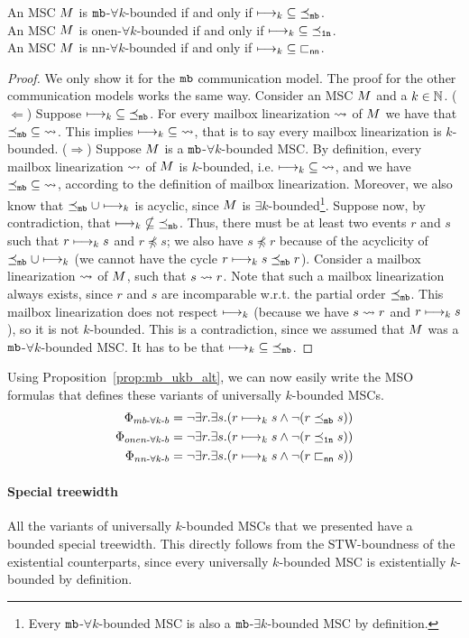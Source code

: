 \begin{proposition}\label{prop:mb_ukb_alt}
	An MSC $M$ is $\mathtt{mb}$-$\forall k$-bounded if and only if $\longmapsto_k \;\subseteq\; \preceq_{\mathtt{mb}}$.\\
	An MSC $M$ is onen-$\forall k$-bounded if and only if $\longmapsto_k \;\subseteq\; \preceq_{\mathtt{1n}}$.\\
	An MSC $M$ is nn-$\forall k$-bounded if and only if $\longmapsto_k \;\subseteq\; \sqsubset_{\mathsf{nn}}$.
\end{proposition}
\begin{proof}
	We only show it for the $\mathtt{mb}$ communication model. The proof for the other communication models works the same way. Consider an MSC $M$ and a $k \in \mathbb{N}$.\newline
	($\Leftarrow$) Suppose $\longmapsto_k \;\subseteq\; \preceq_{\mathtt{mb}}$. For every mailbox linearization $\rightsquigarrow$ of $M$ we have that $\preceq_{\mathtt{mb}} \;\subseteq\; \rightsquigarrow$. This implies $\longmapsto_k \;\subseteq\; \rightsquigarrow$, that is to say every mailbox linearization is $k$-bounded.\newline
	($\Rightarrow$) Suppose $M$ is a $\mathtt{mb}$-$\forall k$-bounded MSC. By definition, every mailbox linearization $\rightsquigarrow$ of $M$ is $k$-bounded, i.e. $\longmapsto_k \;\subseteq\; \rightsquigarrow$, and we have $\preceq_{\mathtt{mb}} \;\subseteq\; \rightsquigarrow$, according to the definition of mailbox linearization. Moreover, we also know that $\preceq_{\mathtt{mb}} \cup \longmapsto_k$ is acyclic, since $M$ is $\exists k$-bounded\footnote{Every $\mathtt{mb}$-$\forall k$-bounded MSC is also a $\mathtt{mb}$-$\exists k$-bounded MSC by definition.}. Suppose now, by contradiction, that $\longmapsto_k \;\nsubseteq\; \preceq_{\mathtt{mb}}$. Thus, there must be at least two events $r$ and $s$ such that $r \longmapsto_k s$ and $r \npreceq s$; we also have $s \npreceq r$ because of the acyclicity of $\preceq_{\mathtt{mb}} \cup \longmapsto_k$ (we cannot have the cycle $r \longmapsto_k s \preceq_{\mathtt{mb}} r$). Consider a mailbox linearization $\rightsquigarrow$  of $M$, such that $s \rightsquigarrow r$. Note that such a mailbox linearization always exists, since $r$ and $s$ are incomparable w.r.t. the partial order $\preceq_{\mathtt{mb}}$. This mailbox linearization does not respect $\longmapsto_k$ (because we have $s \rightsquigarrow r$ and $r \longmapsto_k s$), so it is not $k$-bounded. This is a contradiction, since we assumed that $M$ was a $\mathtt{mb}$-$\forall k$-bounded MSC. It has to be that $\longmapsto_k \;\subseteq\; \preceq_{\mathtt{mb}}$.
\end{proof}

Using Proposition~\ref{prop:mb_ukb_alt}, we can now easily write the MSO formulas that defines these variants of universally $k$-bounded MSCs.
\begin{align*}
	\Phi_{mb\text{-}\forall k\text{-}b} &= \neg \exists r.\exists s.(r \longmapsto_k s \wedge \neg(r \preceq_{\mathtt{mb}} s)) \\
	\Phi_{onen\text{-}\forall k\text{-}b} &= \neg \exists r.\exists s.(r \longmapsto_k s \wedge \neg(r \preceq_{\mathtt{1n}} s)) \\
	\Phi_{nn\text{-}\forall k\text{-}b} &= \neg \exists r.\exists s.(r \longmapsto_k s \wedge \neg(r \sqsubset_{\mathsf{nn}} s))
\end{align*}


\paragraph*{Special treewidth}

All the variants of universally $k$-bounded MSCs that we presented have a bounded special treewidth. This directly follows from the STW-boundness of the existential counterparts, since every universally $k$-bounded MSC is existentially $k$-bounded by definition.
